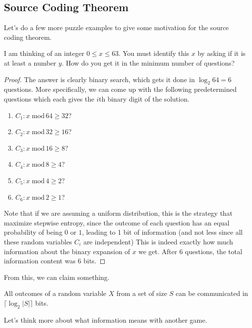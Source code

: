 \documentclass{article}
\begin{document}
  \subsection{Source Coding Theorem}

    Let's do a few more puzzle examples to give some motivation for the source coding theorem. 

    \begin{exercise}[63 Puzzle]
      I am thinking of an integer $0 \leq x \leq 63$. You must identify this $x$ by asking if it is at least a number $y$. How do you get it in the minimum number of questions? 
    \end{exercise}

    \begin{proof}
      The answer is clearly binary search, which gets it done in $\log_2 64 = 6$ questions. More specifically, we can come up with the following predetermined questions which each gives the $i$th binary digit of the solution. 
      \begin{enumerate}
        \item $C_1: x \; \mathrm{mod} \, 64 \geq 32$? 
        \item $C_2: x \; \mathrm{mod} \, 32 \geq 16$? 
        \item $C_3: x \; \mathrm{mod} \, 16 \geq 8$? 
        \item $C_4: x \; \mathrm{mod} \, 8 \geq 4$? 
        \item $C_5: x \; \mathrm{mod} \, 4 \geq 2$? 
        \item $C_6: x \; \mathrm{mod} \, 2 \geq 1$? 
      \end{enumerate}
      Note that if we are assuming a uniform distribution, this is the strategy that maximize stepwise entropy, since the outcome of each question has an equal probability of being $0$ or $1$, leading to 1 bit of information (and not less since all these random variables $C_i$ are independent) This is indeed exactly how much information about the binary expansion of $x$ we get. After 6 questions, the total information content was 6 bits. 
    \end{proof}

    From this, we can claim something. 

    \begin{lemma}
      All outcomes of a random variable $X$ from a set of size $S$ can be communicated in $\lceil \log_2 |S| \rceil$ bits. 
    \end{lemma}

    Let's think more about what information means with another game. 
\end{document}
